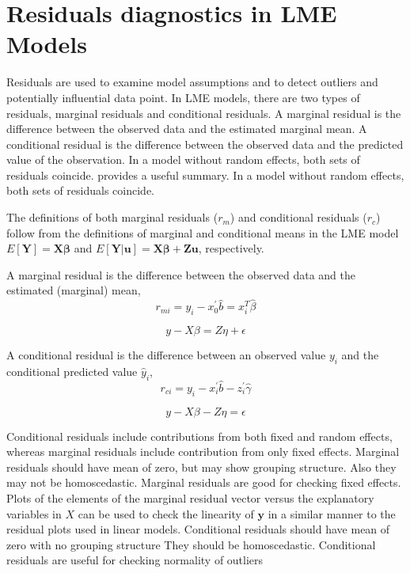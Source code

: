 \documentclass[12pt, a4paper]{report}
\theoremstyle{plain}
\theoremstyle{definition}
\theoremstyle{remark}
\begin{document}
\chapter{Residuals diagnostics in LME Models}
Residuals are used to examine model assumptions and to detect outliers and potentially influential data
point. In LME models, there are two types of residuals, marginal residuals and conditional residuals. A marginal residual is the difference between the observed data and the estimated marginal mean. A conditional residual is the difference between the observed data and the predicted value of the observation. In a model without random effects, both sets of residuals coincide. \citet{schabenberger} provides a useful summary. In a model without random effects, both sets of residuals coincide.

The definitions of both marginal residuals ($r_m$) and conditional residuals ($r_c$) follow from the definitions of marginal and conditional means in the LME model 
$E[\boldsymbol{Y}] = \boldsymbol{X}\boldsymbol{\beta}$ and $E[\boldsymbol{Y|\boldsymbol{u}}] = \boldsymbol{X}\boldsymbol{\beta} + \boldsymbol{Z}\boldsymbol{u}$, respectively.

A marginal residual is the difference between the observed data and the estimated (marginal) mean, 
\[r_{mi} = y_i - x_0^{\prime} \hat{b} =x^{T}_{i}\hat{\beta}\]

\[y - X\beta = Z \eta +\epsilon \]

A conditional residual is the difference between an observed value $y_{i}$ and the conditional predicted value $\hat{y}_{i} $,
\[r_{ci} = y_i - x_i^{\prime} \hat{b} - z_i^{\prime} \hat{\gamma}\]

\[y - X\beta - Z \eta = \epsilon \]

Conditional residuals include contributions from both fixed and random effects, whereas marginal residuals include contribution from only fixed effects. Marginal residuals should have mean of zero, but may show grouping structure. 
Also they may not be homoscedastic. Marginal residuals are good for checking fixed effects.	Plots of the elements of the marginal residual vector versus the explanatory variables in $X$ can be used to check the linearity of $\boldsymbol{y}$ in a similar manner to the residual plots used in linear models.
Conditional residuals should have mean of zero with no grouping structure
They should be homoscedastic. Conditional residuals are useful for checking normality of outliers
\end{document}
